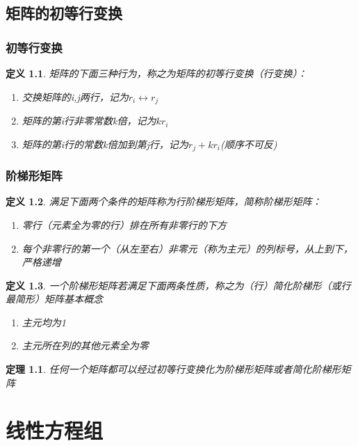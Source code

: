 \documentclass[a4paper]{ctexbook}
\newtheorem{definition}{定义}[section]
\newtheorem{theorem}[section]{定理}
\begin{document}
\chapter{矩阵的初等行变换}
\section{初等行变换}
\begin{definition}
    \kaishu 矩阵的下面三种行为，称之为矩阵的初等行变换（行变换）：
\begin{enumerate}
    \item 交换矩阵的i,j两行，记为\(r_i \leftrightarrow r_j \)
    \item 矩阵的第i行非零常数k倍，记为\(kr_i\)
    \item 矩阵的第i行的常数k倍加到第j行，记为\(r_j+kr_i\)(顺序不可反)
\end{enumerate}
\end{definition}

\section{阶梯形矩阵}
\begin{definition}
    满足下面两个条件的矩阵称为行阶梯形矩阵，简称阶梯形矩阵：
\begin{enumerate}
    \item 零行（元素全为零的行）排在所有非零行的下方
    \item 每个非零行的第一个（从左至右）非零元（称为主元）的列标号，从上到下，严格递增
\end{enumerate}
\end{definition}

\begin{definition}
    一个阶梯形矩阵若满足下面两条性质，称之为（行）简化阶梯形（或行最简形）矩阵基本概念
\begin{enumerate}
    \item 主元均为1
    \item 主元所在列的其他元素全为零
\end{enumerate}
\end{definition}



\begin{theorem}
    任何一个矩阵都可以经过初等行变换化为阶梯形矩阵或者简化阶梯形矩阵
\end{theorem}

\part{线性方程组}
\end{document}
